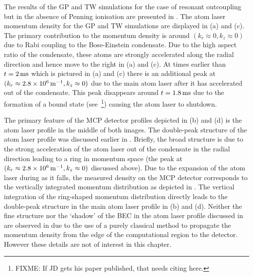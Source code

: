 The results of the GP and TW simulations for the case of resonant outcoupling but in the absence of Penning ionisation are presented in . The atom laser momentum density for the GP and TW simulations are displayed in (a) and (c). The primary contribution to the momentum density is around $(k_r \approx 0, k_z \approx 0)$ due to Rabi coupling to the Bose-Einstein condensate. Due to the high aspect ratio of the condensate, these atoms are strongly accelerated along the radial direction and hence move to the right in (a) and (c). At times earlier than $t=\unit[2]{ms}$ which is pictured in (a) and (c) there is an additional peak at $(k_r \approx \unit[2.8 \times 10^6]{m}^{-1}, k_z \approx 0)$ due to the main atom laser after it has accelerated out of the condensate. This peak disappears around $t=\unit[1.8]{ms}$ due to the formation of a bound state (see~\citep{Robins:2005uq}\footnote{FIXME: If JD gets his paper published, that needs citing here.}) causing the atom laser to shutdown.

The primary feature of the MCP detector profiles depicted in (b) and (d) is the atom laser profile in the middle of both images. The double-peak structure of the atom laser profile was discussed earlier in . Briefly, the broad structure is due to the strong acceleration of the atom laser out of the condensate in the radial direction leading to a ring in momentum space (the peak at $(k_r \approx \unit[2.8 \times10^6]{m}^{-1}, k_z \approx 0)$ discussed above). Due to the expansion of the atom laser during as it falls, the measured density on the MCP detector corresponds to the vertically integrated momentum distribution as depicted in . The vertical integration of the ring-shaped momentum distribution directly leads to the double-peak structure in the main atom laser profile in (b) and (d). Neither the fine structure nor the `shadow' of the BEC in the atom laser profile discussed in  are observed in  due to the use of a purely classical method to propagate the momentum density from the edge of the computational region to the detector. However these details are not of interest in this chapter.

